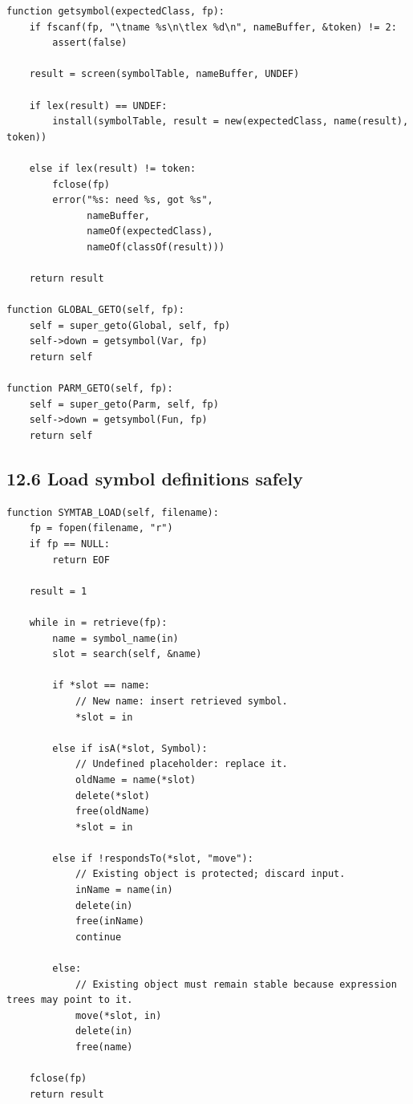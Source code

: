 \documentclass[11pt]{article}
\begin{document}
\begin{verbatim}
function getsymbol(expectedClass, fp):
    if fscanf(fp, "\tname %s\n\tlex %d\n", nameBuffer, &token) != 2:
        assert(false)

    result = screen(symbolTable, nameBuffer, UNDEF)

    if lex(result) == UNDEF:
        install(symbolTable, result = new(expectedClass, name(result), token))

    else if lex(result) != token:
        fclose(fp)
        error("%s: need %s, got %s",
              nameBuffer,
              nameOf(expectedClass),
              nameOf(classOf(result)))

    return result

function GLOBAL_GETO(self, fp):
    self = super_geto(Global, self, fp)
    self->down = getsymbol(Var, fp)
    return self

function PARM_GETO(self, fp):
    self = super_geto(Parm, self, fp)
    self->down = getsymbol(Fun, fp)
    return self
\end{verbatim}

\subsection{12.6 Load symbol definitions
safely}\label{load-symbol-definitions-safely}

\begin{verbatim}
function SYMTAB_LOAD(self, filename):
    fp = fopen(filename, "r")
    if fp == NULL:
        return EOF

    result = 1

    while in = retrieve(fp):
        name = symbol_name(in)
        slot = search(self, &name)

        if *slot == name:
            // New name: insert retrieved symbol.
            *slot = in

        else if isA(*slot, Symbol):
            // Undefined placeholder: replace it.
            oldName = name(*slot)
            delete(*slot)
            free(oldName)
            *slot = in

        else if !respondsTo(*slot, "move"):
            // Existing object is protected; discard input.
            inName = name(in)
            delete(in)
            free(inName)
            continue

        else:
            // Existing object must remain stable because expression trees may point to it.
            move(*slot, in)
            delete(in)
            free(name)

    fclose(fp)
    return result
\end{verbatim}
\end{document}
